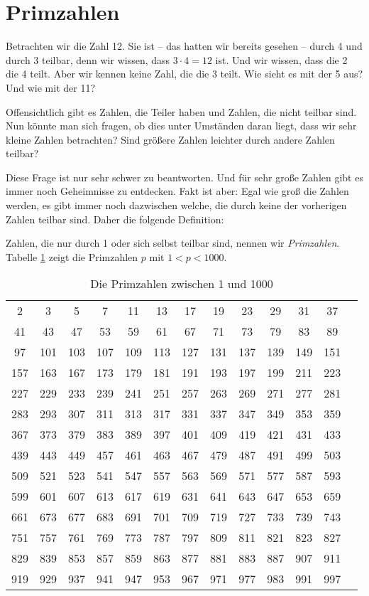 \section{Primzahlen}

Betrachten wir die Zahl 12. Sie ist -- das hatten wir bereits gesehen -- durch 4 und durch 3 teilbar, denn wir wissen, dass $3\cdot 4 = 12$ ist. Und wir wissen, dass die 2 die 4 teilt. Aber wir kennen keine Zahl, die die 3 teilt. Wie sieht es mit der 5 aus? Und wie mit der 11?

Offensichtlich gibt es Zahlen, die Teiler haben und Zahlen, die nicht teilbar sind. Nun könnte man sich fragen, ob dies unter Umständen daran liegt, dass wir sehr kleine Zahlen betrachten? Sind größere Zahlen leichter durch andere Zahlen teilbar? 

Diese Frage ist nur sehr schwer zu beantworten. Und für sehr große Zahlen gibt es immer noch Geheimnisse zu entdecken. Fakt ist aber: Egal wie groß die Zahlen werden, es gibt immer noch dazwischen welche, die durch keine der vorherigen Zahlen teilbar sind. Daher die folgende Definition:

\begin{definition}
Zahlen, die nur durch 1 oder sich selbst teilbar sind, nennen wir \emph{Primzahlen}. Tabelle \ref{tab:primes} zeigt die Primzahlen $p$ mit $1 < p < 1000$.
\end{definition}


\begin{table}
\begin{tabular}{ccccccccccccc}
2 & 3 & 5 & 7 & 11 & 13 & 17 & 19 & 23 & 29 & 31 & 37 &  \\
41 & 43 & 47 & 53 & 59 & 61 & 67 & 71 & 73 & 79 & 83 & 89 &  \\
97 & 101 & 103 & 107 & 109 & 113 & 127 & 131 & 137 & 139 & 149 & 151 &  \\
157 & 163 & 167 & 173 & 179 & 181 & 191 & 193 & 197 & 199 & 211 & 223 &  \\
227 & 229 & 233 & 239 & 241 & 251 & 257 & 263 & 269 & 271 & 277 & 281 &  \\
283 & 293 & 307 & 311 & 313 & 317 & 331 & 337 & 347 & 349 & 353 & 359 &  \\
367 & 373 & 379 & 383 & 389 & 397 & 401 & 409 & 419 & 421 & 431 & 433 &  \\
439 & 443 & 449 & 457 & 461 & 463 & 467 & 479 & 487 & 491 & 499 & 503 &  \\
509 & 521 & 523 & 541 & 547 & 557 & 563 & 569 & 571 & 577 & 587 & 593 &  \\
599 & 601 & 607 & 613 & 617 & 619 & 631 & 641 & 643 & 647 & 653 & 659 &  \\
661 & 673 & 677 & 683 & 691 & 701 & 709 & 719 & 727 & 733 & 739 & 743 &  \\
751 & 757 & 761 & 769 & 773 & 787 & 797 & 809 & 811 & 821 & 823 & 827 &  \\
829 & 839 & 853 & 857 & 859 & 863 & 877 & 881 & 883 & 887 & 907 & 911 &  \\
919 & 929 & 937 & 941 & 947 & 953 & 967 & 971 & 977 & 983 & 991 & 997 
\end{tabular}
\caption{Die Primzahlen zwischen 1 und 1000}\label{tab:primes}
\end{table}

